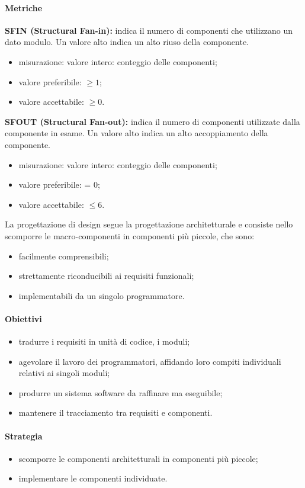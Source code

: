 \paragraph{Metriche}
\textbf{SFIN (Structural Fan-in):} indica il numero di componenti che utilizzano un dato modulo. Un valore alto indica un alto riuso della componente.
\begin{itemize}
    \item misurazione: valore intero: conteggio delle componenti;
    \item valore preferibile: $\geq 1$;
    \item valore accettabile: $\geq 0$.
\end{itemize}
\textbf{SFOUT (Structural Fan-out):} indica il numero di componenti utilizzate dalla componente in esame. Un valore alto indica un alto accoppiamento della componente.
\begin{itemize}
    \item misurazione: valore intero: conteggio delle componenti;
    \item valore preferibile: = 0;
    \item valore accettabile: $\leq 6$.
\end{itemize}
La progettazione di design segue la progettazione architetturale e consiste nello scomporre le macro-componenti in componenti 
più piccole, che sono:
\begin{itemize}
    \item facilmente comprensibili;
    \item strettamente riconducibili ai requisiti funzionali;
    \item implementabili da un singolo programmatore.
\end{itemize}
\paragraph{Obiettivi}
\begin{itemize}
    \item tradurre i requisiti in unità di codice, i moduli;
    \item agevolare il lavoro dei programmatori, affidando loro compiti individuali relativi ai singoli moduli;
    \item produrre un sistema software da raffinare ma eseguibile;
    \item mantenere il tracciamento tra requisiti e componenti.
\end{itemize}
\paragraph{Strategia}
\begin{itemize}
    \item scomporre le componenti architetturali in componenti più piccole;
    \item implementare le componenti individuate.
\end{itemize}
